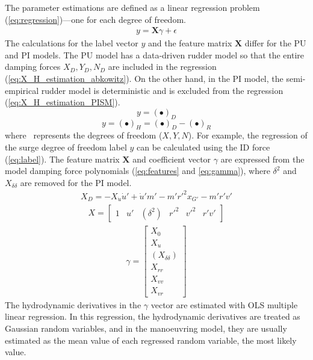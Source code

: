 The parameter estimations are defined as a linear regression problem (\autoref{eq:regression})---one for each degree of freedom. 
\begin{equation}\label{eq:regression}
\begin{split}y = \mathbf{X}\gamma + \epsilon\end{split}
\end{equation}
The calculations for the label vector \(y\) and the feature matrix \(\textbf{X}\) differ for the PU and PI models. The PU model has a data-driven rudder model so that the entire damping forces $X_D,Y_D,N_D$ are included in the regression (\autoref{eq:X_H_estimation_abkowitz}). On the other hand, in the PI model, the semi-empirical rudder model is deterministic and is excluded from the regression (\autoref{eq:X_H_estimation_PISM}). 
\begin{equation}
    \label{eq:X_H_estimation_abkowitz}
    y = (\bullet)_D
\end{equation}
\begin{equation}
    \label{eq:X_H_estimation_PISM}
    y = (\bullet)_H = (\bullet)_D - (\bullet)_R
\end{equation}
where \textbullet\ represents the degrees of freedom ($X,Y,N$).
For example, the regression of the surge degree of freedom label \(y\) can be calculated using the ID force (\autoref{eq:label}). 
The feature matrix \(\textbf{X}\) and coefficient vector $\gamma$ are expressed from the model damping force polynomials (\autoref{eq:features} and \autoref{eq:gamma}), where $\delta^2$ and $X_{\delta\delta}$ are removed for the PI model.
\begin{equation}\label{eq:label}
\begin{split}\displaystyle X_D = - X_{\dot{u}} \dot{u}' + \dot{u}' m' - m' r'^{2} x_{G'} - m' r' v'\end{split}
\end{equation}
\begin{equation}\label{eq:features}
\begin{split}\displaystyle X = \left[\begin{matrix}1 & u' & (\delta^{2}) & r'^{2} & v'^{2} & r' v'\end{matrix}\right]\end{split}
\end{equation}
\begin{equation}\label{eq:gamma}
\begin{split}\displaystyle \gamma = \left[\begin{matrix}X_{0}\\X_{u}\\(X_{\delta\delta})\\X_{rr}\\X_{vv}\\X_{vr}\end{matrix}\right]\end{split}
\end{equation}
The hydrodynamic derivatives in the \(\gamma\) vector are estimated with OLS multiple linear regression.
In this regression, the hydrodynamic derivatives are treated as Gaussian random variables, and in the manoeuvring model, they are usually estimated as the mean value of each regressed random variable, the most likely value.

